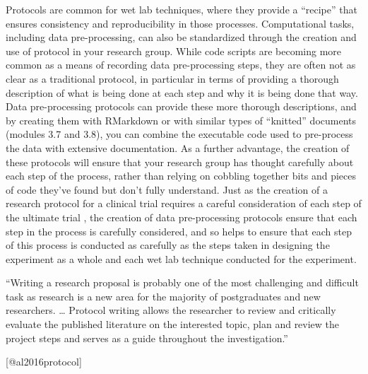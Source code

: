 \documentclass[]{tufte-book}
\begin{document}
Protocols are common for wet lab techniques, where they provide a ``recipe'' that
ensures consistency and reproducibility in those processes. Computational tasks,
including data pre-processing, can also be standardized through the creation and
use of protocol in your research group. While code scripts are becoming more
common as a means of recording data pre-processing steps, they are often not
as clear as a traditional protocol, in particular in terms of providing a
thorough description of what is being done at each step and why it is being
done that way. Data pre-processing protocols can provide these more thorough
descriptions, and by creating them with RMarkdown or with similar types
of ``knitted'' documents (modules 3.7 and 3.8), you can combine the executable code
used to pre-process the data with extensive documentation. As a further
advantage, the creation of these protocols will ensure that your research
group has thought carefully about each step of the process, rather than
relying on cobbling together bits and pieces of code they've found but don't
fully understand. Just as the creation of a research protocol for a
clinical trial requires a careful consideration of each step of the ultimate
trial \citep{al2016protocol}, the creation of data pre-processing protocols ensure
that each step in the process is carefully considered, and so helps to
ensure that each step of this process is conducted as carefully as the
steps taken in designing the experiment as a whole and each wet lab technique
conducted for the experiment.

\begin{marginfigure}
``Writing a research proposal is probably one of the most challenging
and difficult task as research is a new area for the majority of
postgraduates and new researchers. \ldots{} Protocol writing allows the
researcher to review and critically evaluate the published literature on
the interested topic, plan and review the project steps and serves as a
guide throughout the investigation.''

{[}@al2016protocol{]}
\end{marginfigure}
\end{document}
